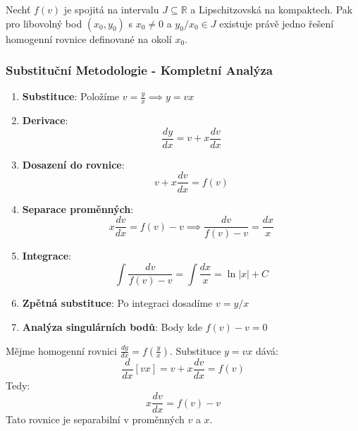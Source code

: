 \vspace{0.6\baselineskip}

\begin{theorem}
Nechť $f(v)$ je spojitá na intervalu $J \subseteq \mathbb{R}$ a Lipschitzovská na kompaktech. Pak pro libovolný bod $(x_0, y_0)$ s $x_0 \neq 0$ a $y_0/x_0 \in J$ existuje právě jedno řešení homogenní rovnice definované na okolí $x_0$.
\end{theorem}

\vspace{0.8\baselineskip}

\subsubsection{Substituční Metodologie - Kompletní Analýza}
\label{subsubsec:substituci-metodologie}

\begin{method}[Základní substituce $v = y/x$]
\label{met:zakladni-substituce}
\begin{enumerate}
\item \textbf{Substituce}: Položíme $v = \frac{y}{x} \implies y = vx$

\item \textbf{Derivace}:
\[
\frac{dy}{dx} = v + x\frac{dv}{dx}
\]

\item \textbf{Dosazení do rovnice}:
\[
v + x\frac{dv}{dx} = f(v)
\]

\item \textbf{Separace proměnných}:
\[
x\frac{dv}{dx} = f(v) - v \implies \frac{dv}{f(v) - v} = \frac{dx}{x}
\]

\item \textbf{Integrace}:
\[
\int \frac{dv}{f(v) - v} = \int \frac{dx}{x} = \ln|x| + C
\]

\item \textbf{Zpětná substituce}: Po integraci dosadíme $v = y/x$

\item \textbf{Analýza singulárních bodů}: Body kde $f(v) - v = 0$
\end{enumerate}
\end{method}

\vspace{0.8\baselineskip}

\begin{example}
Mějme homogenní rovnici $\frac{dy}{dx} = f\left(\frac{y}{x}\right)$. Substituce $y = vx$ dává:
\[
\frac{d}{dx}[vx] = v + x\frac{dv}{dx} = f(v)
\]
Tedy:
\[
x\frac{dv}{dx} = f(v) - v
\]
Tato rovnice je separabilní v proměnných $v$ a $x$.
\end{example}

